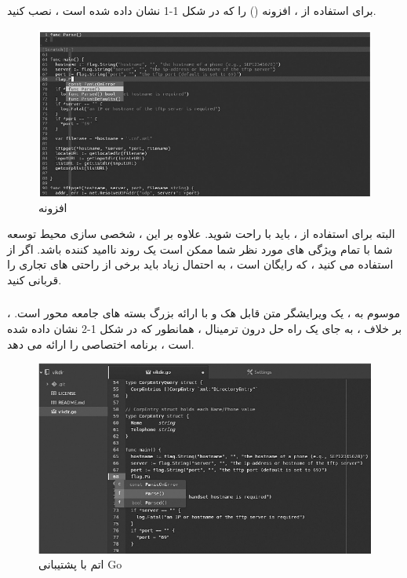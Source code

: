 \documentclass[12pt]{book}
\begin{document}
برای استفاده از  ، افزونه  () را که در شکل 1-1 نشان داده شده است ، نصب کنید.
\begin{figure}
	\caption{افزونه }
	\centering
	\includegraphics[width=1\textwidth]{images/Kazam_screenshot_00002.png}
\end{figure}

البته برای استفاده از  ، باید با  راحت شوید.
علاوه بر این ، شخصی سازی محیط توسعه شما با تمام ویژگی های مورد نظر شما ممکن است یک روند ناامید کننده باشد.
اگر از  استفاده می کنید ، که رایگان است ، به احتمال زیاد باید برخی از راحتی های  تجاری را قربانی کنید.
\subsubsection{}
 ، موسوم به  ، یک ویرایشگر متن قابل هک و با ارائه بزرگ بسته های جامعه محور است.
بر خلاف  ،  به جای یک راه حل درون ترمینال ، همانطور که در شکل 1-2 نشان داده شده است ، برنامه  اختصاصی را ارائه می دهد.
\begin{figure}
	\caption{اتم با پشتیبانی Go}
	\centering
	\includegraphics[width=1\textwidth]{images/atom.png}
\end{figure}
\end{document}
